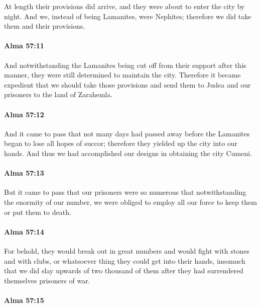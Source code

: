 			At length their provisions did arrive,
			and they were about to enter the city by night.
			And we, instead of being Lamanites, were Nephites;
			therefore we did take them and their provisions.

		\paragraph{Alma 57:11} %
			\label{ALMA-57-11}

			And notwithstanding the Lamanites being cut off
			from their support after this manner,
			they were still determined to maintain the city.
			Therefore it became expedient
			that we should take those provisions and send them to Judea
			and our prisoners to the land of Zarahemla.

		\paragraph{Alma 57:12} %
			\label{ALMA-57-12}

			And it came to pass that not many days had passed away
			before the Lamanites began to lose all hopes of succor;
			therefore they yielded up the city into our hands.
			And thus we had accomplished our designs in obtaining the city Cumeni.

		\paragraph{Alma 57:13} %
			\label{ALMA-57-13}

			But it came to pass that our prisoners were so numerous
			that notwithstanding the enormity of our number,
			we were obliged to employ all our force
			to keep them or put them to death.

		\paragraph{Alma 57:14} %
			\label{ALMA-57-14}

			For behold, they would break out in great numbers
			and would fight with stones and with clubs,
			or whatsoever thing they could get into their hands,
			insomuch that we did slay upwards of two thousand of them
			after they had surrendered themselves prisoners of war.

		\paragraph{Alma 57:15} %
			\label{ALMA-57-15}

